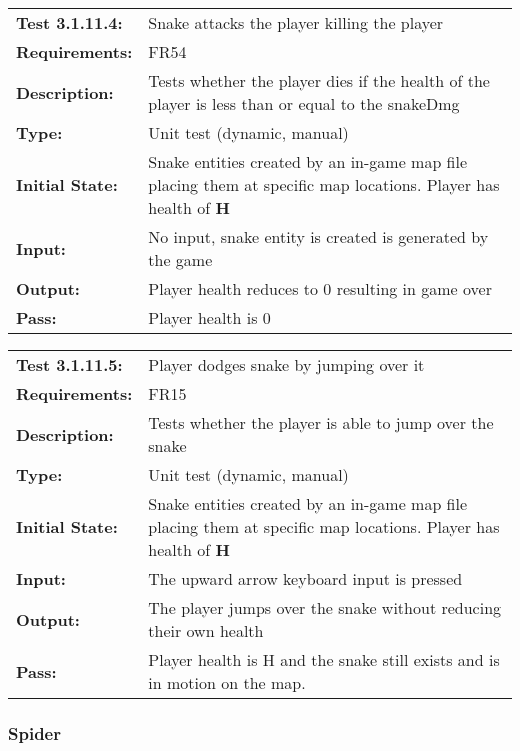 \documentclass[12pt, titlepage]{article}
\begin{document}
\begin{tabular}{|l|p{10cm}|}
    \hline
    \bf{Test} 3.1.11.4: & Snake attacks the player killing the player\ \\
    \bf{Requirements}: & FR54 \\
    \bf{Description}: & Tests whether the player dies if the health of the player is less than or equal to the snakeDmg  \\
    \bf{Type}:  &  Unit test (dynamic, manual)   \\
    \bf{Initial State}: & Snake entities created by an in-game map file placing them at specific map locations. Player has health of $\mathbf{H}$ \\
    \bf{Input}: & No input, snake entity is created is generated by the game \\
    \bf{Output}: & Player health reduces to 0 resulting in game over\\
    \bf{Pass}: & Player health is 0\\
    \hline
\end{tabular}

\begin{tabular}{|l|p{10cm}|}
    \hline
    \bf{Test} 3.1.11.5: & Player dodges snake by jumping over it\ \\
    \bf{Requirements}: & FR15 \\
    \bf{Description}: & Tests whether the player is able to jump over the snake \\
    \bf{Type}:  &  Unit test (dynamic, manual)   \\
    \bf{Initial State}: & Snake entities created by an in-game map file placing them at specific map locations. Player has health of $\mathbf{H}$ \\
    \bf{Input}: & The upward arrow keyboard input is pressed \\
    \bf{Output}: & The player jumps over the snake without reducing their own health\\
    \bf{Pass}: & Player health is H and the snake still exists and is in motion on the map. \\
    \hline
\end{tabular}

\subsubsection{Spider}
\end{document}
